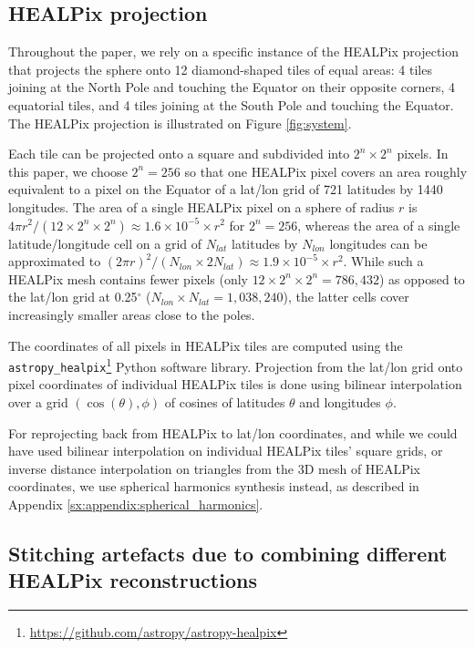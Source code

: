 \subsection{HEALPix projection}

Throughout the paper, we rely on a specific instance of the HEALPix projection that projects the sphere onto 12 diamond-shaped tiles of equal areas: 4 tiles joining at the North Pole and touching the Equator on their opposite corners, 4 equatorial tiles, and 4 tiles joining at the South Pole and touching the Equator. The HEALPix projection is illustrated on Figure \ref{fig:system}.

Each tile can be projected onto a square and subdivided into $2^n \times 2^n$ pixels. In this paper, we choose $2^n = 256$ so that one HEALPix pixel covers an area roughly equivalent to a pixel on the Equator of a lat/lon grid of 721 latitudes by 1440 longitudes.
The area of a single HEALPix pixel on a sphere of radius $r$ is $4 \pi r^2 / (12 \times 2^n \times 2^n) \approx 1.6 \times 10^{-5} \times r^2$ for $2^n = 256$, whereas the area of a single latitude/longitude cell on a grid of $N_{lat}$ latitudes by $N_{lon}$ longitudes can be approximated to $(2 \pi r)^2 / (N_{lon} \times 2 N_{lat}) \approx 1.9 \times 10^{-5} \times r^2$. While such a HEALPix mesh contains fewer pixels (only $12 \times 2^n \times 2^n = 786,432$) as opposed to the lat/lon grid at 0.25$^\circ$ ($N_{lon} \times N_{lat} = 1,038,240$), the latter cells cover increasingly smaller areas close to the poles.

The coordinates of all pixels in HEALPix tiles are computed using the {\tt astropy\_healpix}\footnote{\url{https://github.com/astropy/astropy-healpix}} Python software library. Projection from the lat/lon grid onto pixel coordinates of individual HEALPix tiles is done using bilinear interpolation over a grid $(\cos(\theta), \phi)$ of cosines of latitudes $\theta$ and longitudes $\phi$.

For reprojecting back from HEALPix to lat/lon coordinates, and while we could have used bilinear interpolation on individual HEALPix tiles' square grids, or inverse distance interpolation on triangles from the 3D mesh of HEALPix coordinates, we use spherical harmonics synthesis instead, as described in Appendix \ref{sx:appendix:spherical_harmonics}.

\subsection{Stitching artefacts due to combining different HEALPix reconstructions}

